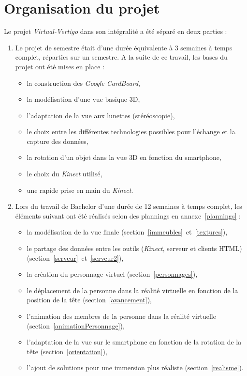 \section{Organisation du projet}
Le projet \textit{Virtual-Vertigo} dans son intégralité a été séparé en deux parties : 
\begin{enumerate}
\item Le \textsf{projet de semestre} était d'une durée équivalente à 3 semaines à temps complet, réparties sur un semestre. A la suite de ce travail, les bases du projet ont été mises en place :
\begin{itemize}
\item la construction des \textit{Google CardBoard},
\item la modélisation d'une vue basique 3D,
\item l'adaptation de la vue aux lunettes (stéréoscopie),
\item le choix entre les différentes technologies possibles pour l'échange et la capture des données,
\item la rotation d'un objet dans la vue 3D en fonction du smartphone,
\item le choix du \textit{Kinect} utilisé,
\item une rapide prise en main du \textit{Kinect}. \\

\end{itemize}

\item Lors du \textsf{travail de Bachelor} d'une durée de 12 semaines à temps complet, les éléments suivant ont été réalisés selon des plannings en annexe~\ref{plannings} :
\begin{itemize}
\item la modélisation de la vue finale (section~\ref{immeubles}~et~\ref{textures}),
\item le partage des données entre les outils (\textit{Kinect}, serveur et clients HTML) (section~\ref{serveur}~et~\ref{serveur2}),
\item la création du personnage virtuel (section~\ref{personnages}),
\item le déplacement de la personne dans la réalité virtuelle en fonction de la position de la tête (section~\ref{avancement}),
\item l'animation des membres de la personne dans la réalité virtuelle (section~\ref{animationPersonnage}),
\item l'adaptation de la vue sur le smartphone en fonction de la rotation de la tête (section~\ref{orientation}),
\item l'ajout de solutions pour une immersion plus réaliste (section~\ref{realisme}).
\end{itemize}

\end{enumerate}
